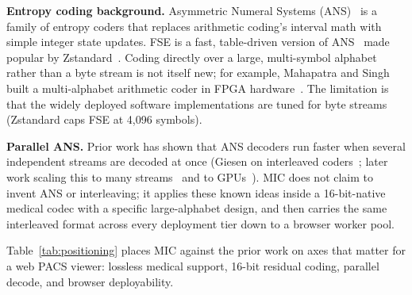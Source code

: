 \documentclass[journal]{IEEEtran}
\begin{document}
\textbf{Entropy coding background.} Asymmetric Numeral Systems
(ANS)~\cite{duda2009,duda2013} is a family of entropy coders that replaces
arithmetic coding's interval math with simple integer state updates. FSE is a
fast, table-driven version of ANS~\cite{fse} made popular by
Zstandard~\cite{rfc8878}. Coding directly over a large, multi-symbol alphabet
rather than a byte stream is not itself new; for example, Mahapatra and Singh
built a multi-alphabet arithmetic coder in FPGA hardware~\cite{mahapatra2007}.
The limitation is that the widely deployed software implementations are tuned
for byte streams (Zstandard caps FSE at 4,096 symbols).

\textbf{Parallel ANS.} Prior work has shown that ANS decoders run faster when
several independent streams are decoded at once (Giesen on interleaved
coders~\cite{giesen2014}; later work scaling this to many
streams~\cite{lin2023} and to GPUs~\cite{weissenberger2019}). MIC does not
claim to invent ANS or interleaving; it applies these known ideas inside a
16-bit-native medical codec with a specific large-alphabet design, and then
carries the same interleaved format across every deployment tier down to a
browser worker pool.

Table~\ref{tab:positioning} places MIC against the prior work on axes that
matter for a web PACS viewer: lossless medical support, 16-bit residual
coding, parallel decode, and browser deployability.
\end{document}
